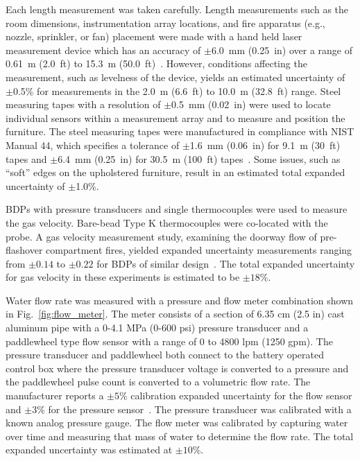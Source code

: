 \documentclass[12pt,oneside]{book}
\begin{document}
Each length measurement was taken carefully. Length measurements such as the room dimensions, instrumentation array locations, and fire apparatus (e.g., nozzle, sprinkler, or fan) placement were made with a hand held laser measurement device which has an accuracy of $\pm$6.0~mm (0.25~in) over a range of 0.61~m (2.0~ft) to 15.3~m (50.0~ft)~\cite{StanleyTools}.  However, conditions affecting the measurement, such as levelness of the device, yields an estimated uncertainty of $\pm$0.5\% for measurements in the 2.0~m (6.6~ft) to 10.0~m (32.8~ft) range. Steel measuring tapes with a resolution of $\pm$0.5~mm (0.02~in) were used to locate individual sensors within a measurement array and to measure and position the furniture. The steel measuring tapes were manufactured in compliance with NIST Manual 44, which specifies a tolerance of $\pm$1.6~mm (0.06~in) for 9.1~m (30~ft) tapes and $\pm$6.4~mm (0.25~in) for 30.5~m (100~ft) tapes~\cite{Butcher:2012}. Some issues, such as ``soft'' edges on the upholstered furniture, result in an estimated total expanded uncertainty of $\pm$1.0\%.

BDPs with pressure transducers and single thermocouples were used to measure the gas velocity. Bare-bead Type K thermocouples were co-located with the probe. A gas velocity measurement study, examining the doorway flow of pre-flashover compartment fires, yielded expanded uncertainty measurements ranging from $\pm0.14$ to $\pm0.22$ for BDPs of similar design~\cite{Bryant:FSJ2009}. The total expanded uncertainty for gas velocity in these experiments is estimated to be $\pm18$\%.   

Water flow rate was measured with a pressure and flow meter combination shown in Fig.~\ref{fig:flow_meter}. The meter consists of a section of 6.35 cm (2.5 in) cast aluminum pipe with a 0-4.1 MPa (0-600 psi) pressure transducer and a paddlewheel type flow sensor with a range of 0 to 4800 lpm (1250 gpm). The pressure transducer and paddlewheel both connect to the battery operated control box where the pressure transducer voltage is converted to a pressure and the paddlewheel pulse count is converted to a volumetric flow rate. The manufacturer reports a $\pm5$\% calibration expanded uncertainty for the flow sensor and $\pm3$\%  for the pressure sensor~\cite{Akron}. The pressure transducer was calibrated with a known analog pressure gauge. The flow meter was calibrated by capturing water over time and measuring that mass of water to determine the flow rate. The total expanded uncertainty was estimated at $\pm10$\%. 
\end{document}

